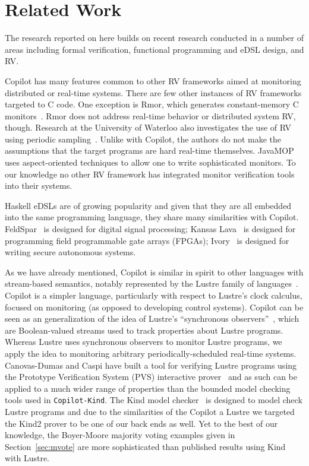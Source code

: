 \section{Related Work}\label{sec:related}
The research reported on here builds on recent  research conducted in a number
of areas including formal verification, functional programming and
eDSL design, and RV.  

Copilot has many features common to other RV frameworks aimed at
 monitoring distributed or real-time systems.  
There are few other instances of RV frameworks targeted to C code.  One exception is {\sc
  Rmor}, which generates constant-memory C monitors~\cite{havelundc}.  {\sc
  Rmor} does not address real-time behavior or distributed system RV,
though.   Research at the University of Waterloo also investigates the use of
 RV using  periodic sampling~\cite{sampling}.  Unlike with Copilot, the authors
do not make the assumptions that the target programs are hard real-time
themselves.  JavaMOP~\cite{javamop}  uses aspect-oriented techniques
to allow one to write sophisticated monitors. To our knowledge no
other RV framework has integrated monitor verification tools into
their systems. 

Haskell eDSLs are of growing popularity and given that they are all
embedded into the same programming language, they share many
similarities with Copilot. FeldSpar~\cite{feldspar} is designed for digital signal
processing;  Kansas Lava~\cite{Gill:14:DSLs} is designed for
programming  field programmable gate arrays (FPGAs);
Ivory~\cite{pike-plpv14} is designed for writing secure autonomous
systems. 

  As we have already mentioned, Copilot is similar in spirit to other languages with stream-based semantics,
notably represented by the Lustre family of languages~\cite{lustre-intro}.
Copilot is a simpler language, particularly with respect to Lustre's clock
calculus, focused on monitoring (as opposed to developing control systems).
Copilot can be seen as an generalization of the idea of Lustre's ``synchronous
observers''~\cite{Halbwachs93}, which are Boolean-valued streams used to track
properties about Lustre programs.  Whereas Lustre uses synchronous observers to
monitor Lustre programs, we apply the idea to monitoring arbitrary
periodically-scheduled real-time systems. Canovas-Dumas and Caspi have
built a tool for verifying Lustre programs using the Prototype
Verification System (PVS) interactive prover~\cite{Canovas-Dumas:2000}
and as such can be applied to a much wider range of properties than
the bounded model checking tools used in \texttt{Copilot-Kind}.  The
Kind model checker~\cite{kind2} is designed to model
check Lustre programs and due to the  similarities of the Copilot a
Lustre we targeted the Kind2 prover to be one of our back ends as
well.  Yet to the best of our knowledge, the Boyer-Moore majority
voting examples given in Section~\ref{sec:mvote} are more
sophisticated than published results using Kind with Lustre. 
  


